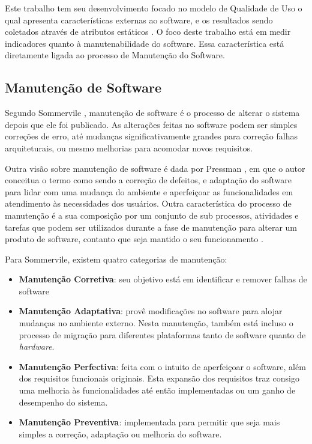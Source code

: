 Este trabalho tem seu desenvolvimento focado no modelo de Qualidade de Uso 
o qual apresenta características externas ao software, e os resultados sendo coletados através de atributos estáticos \cite{Square}. O foco deste trabalho está em medir indicadores quanto à manutenabilidade do software. Essa característica está diretamente ligada ao processo de Manutenção do Software.  

\subsection{Manutenção de Software}
Segundo Sommervile \cite{sommervile}, manutenção de software é o processo de alterar o sistema depois que ele foi publicado. As alterações feitas no software podem ser simples correções de erro, até mudanças significativamente grandes para correção falhas arquiteturais, ou mesmo melhorias para acomodar novos requisitos.

Outra visão sobre manutenção de software é dada por Pressman \cite{pressman}, em que o autor conceitua o termo como sendo a correção de defeitos, e adaptação do software para lidar com uma mudança do ambiente e aperfeiçoar as funcionalidades em atendimento às necessidades dos usuários. Outra característica do processo de manutenção é a sua composição por um conjunto de sub processos, atividades e tarefas que podem ser utilizados durante a fase de manutenção para alterar um produto de software, contanto que seja mantido o seu funcionamento \cite{calazans_avaliacao_2005}.

Para Sommervile, existem quatro categorias de manutenção:
\begin{itemize}
\item \textbf{Manutenção Corretiva}: seu objetivo está em identificar e remover falhas de software
\item \textbf{Manutenção Adaptativa}: provê modificações no software para alojar mudanças no ambiente externo. Nesta manutenção, também está incluso o processo de migração para diferentes plataformas tanto de software quanto de \textit{hardware}.
\item \textbf{Manutenção Perfectiva}: feita com o intuito de aperfeiçoar o software, além dos requisitos funcionais originais. Esta expansão dos requisitos traz consigo uma melhoria às funcionalidades até então implementadas ou um ganho de desempenho do sistema.
\item \textbf{Manutenção Preventiva}: implementada para permitir que seja mais simples a correção, adaptação ou melhoria do software.
\end{itemize}

